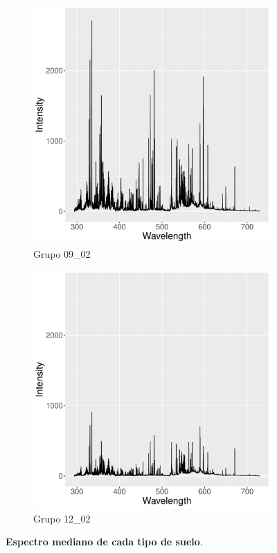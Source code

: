 \documentclass[12pt]{article}
\begin{document}
\begin{figure}[htbp]
\begin{subfigure}[b]{0.45\textwidth}
    \end{subfigure}
    \begin{subfigure}[b]{0.45\textwidth}
        \caption{Grupo 09\_02}
        \includegraphics[width=\textwidth]{median_09_02.pdf}
    \end{subfigure}
    \begin{subfigure}[b]{0.45\textwidth}
        \caption{Grupo 12\_02}
        \includegraphics[width=\textwidth]{median_12_02.pdf}
    \end{subfigure}
    \caption{\textbf{Espectro mediano de cada tipo de suelo}.}  
    \label{fig:samples}
\end{figure}
\end{document}
